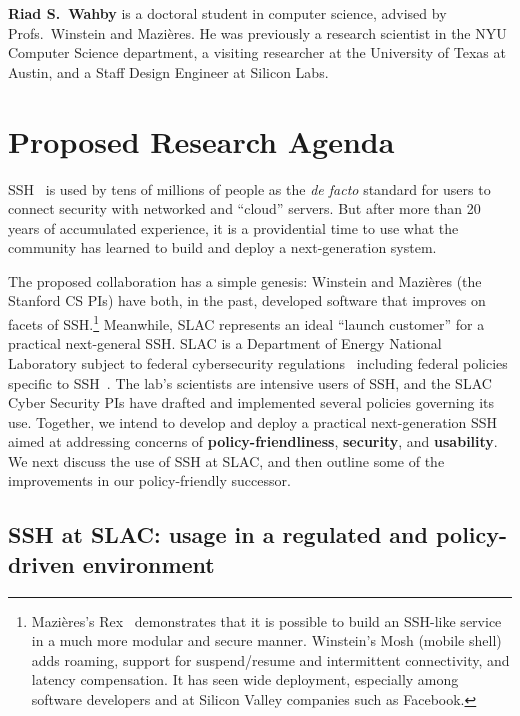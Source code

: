 \documentclass[11pt]{article}
\newcommand{\slim}{\vspace{\baselineskip}}
\begin{document}
\slim

\noindent \textbf{Riad S.~Wahby} is a doctoral student in computer science,
advised by Profs.~Winstein and Mazi\`{e}res. He was previously a
research scientist in the NYU Computer Science department, a
visiting researcher at the University of Texas at Austin, and a Staff
Design Engineer at Silicon Labs.

\section{Proposed Research Agenda}

SSH~\cite{SSH} is used by tens of millions of people as the \emph{de
  facto} standard for users to connect security with networked and
``cloud'' servers. But after more than 20 years of accumulated
experience, it is a providential time to use what the community has
learned to build and deploy a next-generation system.

The proposed collaboration has a simple genesis: Winstein and
Mazi\`{e}res (the Stanford CS PIs) have both, in the past, developed
software that improves on facets of SSH.\footnote{Mazi\`{e}res's
  Rex~\cite{rex} demonstrates that it is possible to build an SSH-like
  service in a much more modular and secure manner. Winstein's Mosh
  (mobile shell)~\cite{Mosh} adds roaming, support for suspend/resume
  and intermittent connectivity, and latency compensation. It has seen
  wide deployment, especially among software developers and at Silicon
  Valley companies such as Facebook.} Meanwhile, SLAC represents an
ideal ``launch customer'' for a practical next-general SSH. SLAC is a
Department of Energy National Laboratory subject to federal
cybersecurity regulations~\cite{cyberframework, nist80053, trumpeo}
including federal policies specific to SSH~\cite{nistSSH}.  The lab's
scientists are intensive users of SSH, and the SLAC Cyber Security PIs
have drafted and implemented several policies governing its
use. Together, we intend to develop and deploy a practical
next-generation SSH aimed at addressing concerns of
\textbf{policy-friendliness}, \textbf{security}, and
\textbf{usability}. We next discuss the use of SSH at SLAC, and then
outline some of the improvements in our policy-friendly successor.

\subsection{SSH at SLAC: usage in a regulated and policy-driven environment}
\end{document}
